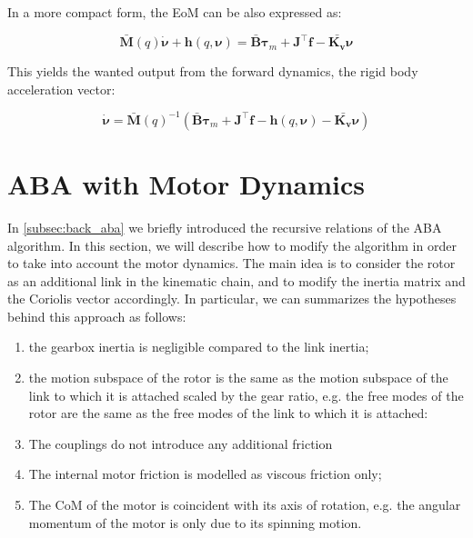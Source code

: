 In a more compact form, the \ac{EoM} can be also expressed as:

\begin{equation}
    \mathbf{\bar{M}}(q)\dot{\boldsymbol{\nu}} + \mathbf{h}(q,\boldsymbol{\nu}) = \mathbf{\bar{B}}\boldsymbol{\tau} _m + \mathbf{J} ^\top \mathbf{f} - \bar{\mathbf{K _v}}\boldsymbol{\nu}
\end{equation}

This yields the wanted output from the forward dynamics, the rigid body acceleration vector:

\begin{equation}
    \dot{\boldsymbol{\nu}} = \mathbf{\bar{M}}(q) ^{-1} (\mathbf{\bar{B}}\boldsymbol{\tau} _m + \mathbf{J} ^\top \mathbf{f} - \mathbf{h}(q,\boldsymbol{\nu}) - \bar{\mathbf{K _v}}\boldsymbol{\nu})
\end{equation}

\section{ABA with Motor Dynamics}

In \cref{subsec:back_aba} we briefly introduced the recursive relations of the \ac{ABA} algorithm. In this section, we will describe how to modify the algorithm in order to take into account the motor dynamics. The main idea is to consider the rotor as an additional link in the kinematic chain, and to modify the inertia matrix and the Coriolis vector accordingly. In particular, we can summarizes the hypotheses behind this approach as follows:

\begin{enumerate}
    \item the gearbox inertia is negligible compared to the link inertia;
    \item the motion subspace of the rotor is the same as the motion subspace of the link to which it is attached scaled by the gear ratio, e.g. the free modes of the rotor are the same as the free modes of the link to which it is attached:
    \item The couplings do not introduce any additional friction
    \item The internal motor friction is modelled as viscous friction only;
    \item The \ac{CoM} of the motor is coincident with its axis of rotation, e.g. the angular momentum of the motor is only due to its spinning motion.
\end{enumerate}

